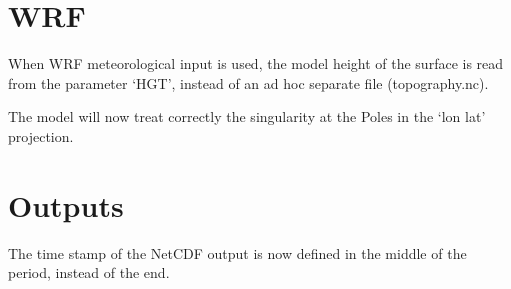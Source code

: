 \section{WRF}

When WRF meteorological input is used, the model height of the surface is
read from the parameter `HGT', instead of an ad hoc separate file (topography.nc).

The model will now treat correctly the singularity at the Poles in the `lon lat' projection.

\section{Outputs}

The time stamp of the NetCDF output is now defined in the middle of the period,
instead of the end. 

%
%


